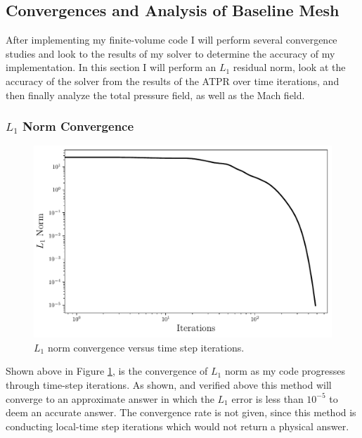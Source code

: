 \pagebreak
\subsection{Convergences and Analysis of Baseline Mesh}

After implementing my finite-volume code I will perform several convergence studies and look to the results of my solver to determine the accuracy of my implementation. In this section I will perform an $L_1$ residual norm, look at the accuracy of the solver from the results of the ATPR over time iterations, and then finally analyze the total pressure field, as well as the Mach field.

\subsubsection{$L_1$ Norm Convergence}
\begin{figure}[h]
    \centering
    \includegraphics[width = 0.9\linewidth]{rep/q3/l1_err.pdf}
    \caption[$L_1$ Norm Convergence for Baseline Mesh]{$L_1$ norm convergence versus time step iterations.}
    \label{fig:l1_mesh0}
\end{figure}

Shown above in Figure \ref{fig:l1_mesh0}, is the convergence of $L_1$ norm as my code progresses through time-step iterations. As shown, and verified above this method will converge to an approximate answer in which the $L_1$ error is less than $10^{-5}$ to deem an accurate answer. The convergence rate is not given, since this method is conducting local-time step iterations which would not return a physical answer.

